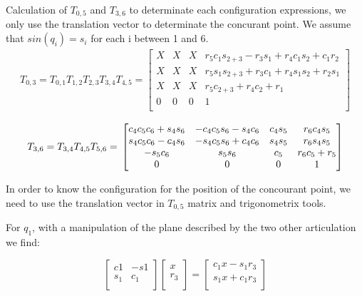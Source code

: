\documentclass{article}
\begin{document}
Calculation of  $T_{0,5}$ and $T_{3,6}$ to determinate each configuration expressions, we only use the translation vector to determinate the concurant point. We assume that $sin(q_i)=s_i$  for each i between 1 and 6. \\
\begin{align*}
T_{0,3} = T_{0,1} T_{1,2} T_{2,3} T_{3,4} T_{4,5} =
\begin{bmatrix}
  X & X & X &r_5c_1s_{2+3}-r_3s_1+r_4c_1s_2+c_1r_2\\
  X & X & X & r_5s_1s_{2+3}+r_3c_1+r_4s_1s_2+r_2s_1 \\
  X & X & X & r_5c_{2+3}+r_4c_2+r_1 \\
  0 & 0 & 0 & 1 \\
\end{bmatrix}
\end{align*}

\[
T_{3,6} = T_{3,4} T_{4,5} T_{5,6}= \\
\begin{bmatrix}
  c_4c_5c_6+s_4s_6 & -c_4c_5s_6-s_4c_6 & c_4s_5 & r_6c_4s_5 \\
  s_4c_5c_6-c_4s_6 & -s_4c_5s_6+c_4c_6 & s_4s_5 & r_6s_4s_5 \\
  -s_5c_6 & s_5s_6 & c_5 & r_6c_5 + r_5 \\
  0 & 0 & 0 & 1 \\
\end{bmatrix}
\]

In order to know the configuration for the position of the concourant point, we need to use the translation vector in $T_{0,5}$ matrix and trigonometrix tools.

For $q_1$, with a manipulation of the plane described by the two other articulation we find:

\begin{equation}
  \begin{bmatrix}
    c1 & -s1\\
    s_1 & c_1\\
  \end{bmatrix}
  \begin{bmatrix}
    x\\
    r_3\\
  \end{bmatrix}
  =
  \begin{bmatrix}
    c_1x-s_1r_3\\
    s_1x+c_1r_3\\
  \end{bmatrix}
\end{equation}
\end{document}
